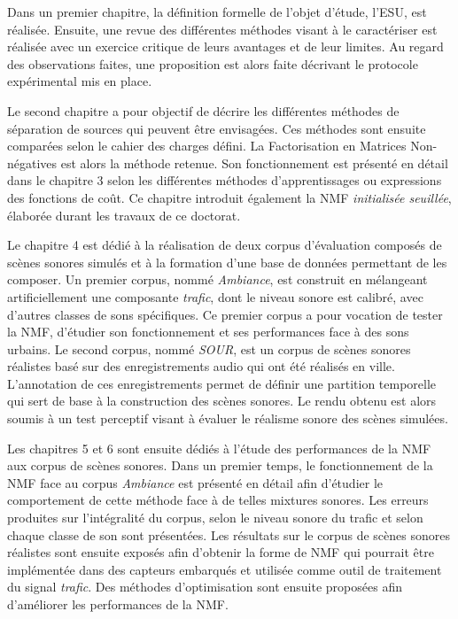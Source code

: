 
Dans un premier chapitre, la définition formelle de l'objet d'étude, l'ESU, est réalisée. Ensuite, une revue des différentes méthodes visant à le caractériser est réalisée avec un exercice critique de leurs avantages et de leur limites. Au regard des observations faites, une proposition est alors faite décrivant le protocole expérimental mis en place.

Le second chapitre a pour objectif de décrire les différentes méthodes de séparation de sources qui peuvent être envisagées. Ces méthodes sont ensuite comparées selon le cahier des charges défini. La Factorisation en Matrices Non-négatives est alors la méthode retenue.
Son fonctionnement est présenté en détail dans le chapitre 3 selon les différentes méthodes d'apprentissages ou expressions des fonctions de coût. Ce chapitre introduit également la NMF \textit{initialisée seuillée}, élaborée durant les travaux de ce doctorat.

Le chapitre 4 est dédié à la réalisation de deux corpus d'évaluation composés de scènes sonores simulés et à la formation d'une base de données permettant de les composer.
Un premier corpus, nommé \textit{Ambiance}, est construit en mélangeant artificiellement une composante \textit{trafic}, dont le niveau sonore est calibré, avec d'autres classes de sons spécifiques. Ce premier corpus a pour vocation de tester la NMF, d'étudier son fonctionnement et ses performances face à des sons urbains.
Le second corpus, nommé \textit{SOUR}, est un corpus de scènes sonores réalistes basé sur des enregistrements audio qui ont été réalisés en ville.
L'annotation de ces enregistrements permet de définir une partition temporelle qui sert de base à la construction des scènes sonores. Le rendu obtenu est alors soumis à un test perceptif visant à évaluer le réalisme sonore des scènes simulées.

Les chapitres 5 et 6 sont ensuite dédiés à l'étude des performances de la NMF  aux corpus de scènes sonores. Dans un premier temps, le fonctionnement de la NMF face au corpus \textit{Ambiance} est présenté en détail afin d'étudier le comportement de cette méthode face à de telles mixtures sonores. Les erreurs produites sur l'intégralité du corpus, selon le niveau sonore du trafic et selon chaque classe de son sont présentées.
Les résultats sur le corpus de scènes sonores réalistes sont ensuite exposés afin d'obtenir la forme  de NMF qui pourrait être implémentée dans des capteurs embarqués et utilisée comme outil de traitement du signal \textit{trafic}. Des méthodes d'optimisation sont ensuite proposées afin d'améliorer les performances de la NMF.
